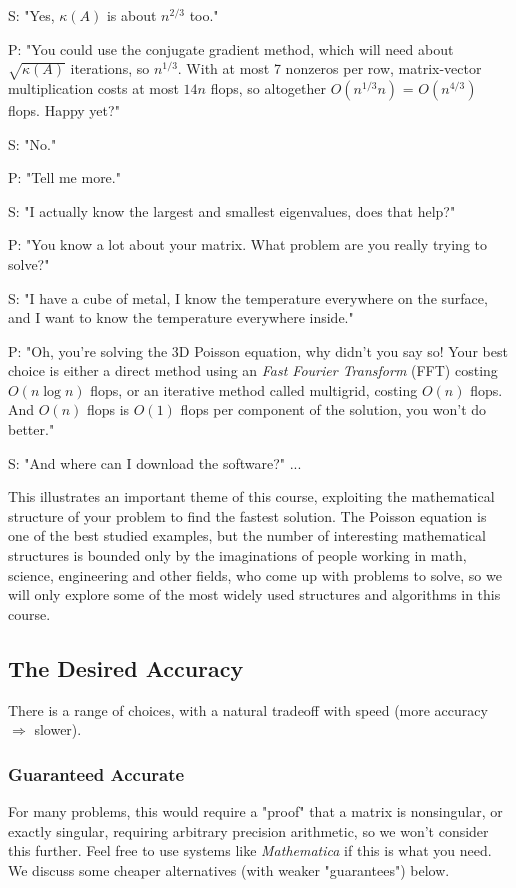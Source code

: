 \documentclass[11pt]{article}
\numberwithin{equation}{section}
\begin{document}
S: "Yes, $\kappa(A)$ is about $n^{2/3}$ too."

P: "You could use the conjugate gradient method, which will need about $\sqrt{\kappa(A)}$ iterations, so $n^{1/3}$. With at most 7 nonzeros per row, 
matrix-vector multiplication costs at most $14n$ flops, so altogether $O(n^{1/3}n)$ = $O(n^{4/3})$ flops. Happy yet?"

S: "No."

P: "Tell me more."

S: "I actually know the largest and smallest eigenvalues, does that help?"

P: "You know a lot about your matrix. What problem are you really trying to solve?"

S: "I have a cube of metal, I know the temperature everywhere on the surface, and I want to know the temperature everywhere inside."

P: "Oh, you're solving the 3D Poisson equation, why didn't you say so! Your best choice is either a direct method using an \textit{Fast Fourier Transform} (FFT) 
costing $O(n \log n)$ flops, or an iterative method called multigrid, costing $O(n)$ flops. And $O(n)$ flops is $O(1)$ flops per component of the solution,
you won't do better."

S: "And where can I download the software?" ...

This illustrates an important theme of this course, exploiting the mathematical structure of your problem to find the fastest solution.
The Poisson equation is one of the best studied examples, but the number of interesting mathematical structures is bounded only by the imaginations of people working in math, science, 
engineering and other fields, who come up with problems to solve, so we will only explore some of the most widely used structures and algorithms in this course.

\subsection{The Desired Accuracy}
There is a range of choices, with a natural tradeoff with speed (more accuracy $\Rightarrow$ slower).

\subsubsection{Guaranteed Accurate}
For many problems, this would require a "proof" that a matrix is nonsingular, or exactly singular, requiring arbitrary precision arithmetic, 
so we won't consider this further. Feel free to use systems like \textit{Mathematica} if this is what you need. 
We discuss some cheaper alternatives (with weaker "guarantees") below.
\end{document}
